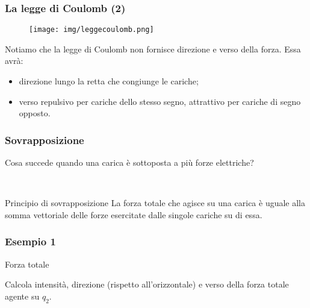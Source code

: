 \documentclass[handout]{beamer}
\theoremstyle{plain}
\begin{document}
\begin{frame}
\frametitle{La legge di Coulomb (2)}
\begin{figure}
\texttt{[image: img/leggecoulomb.png]}
\end{figure}
Notiamo che la legge di Coulomb non fornisce direzione e verso della forza.{\pause} Essa avrà:
\begin{itemize}
  \item direzione lungo la retta che congiunge le cariche;\pause
  \item verso repulsivo per cariche dello stesso segno, attrattivo per cariche di segno opposto.
\end{itemize}
\end{frame}







\begin{frame}
\frametitle{Sovrapposizione}
Cosa succede quando una carica è sottoposta a più forze elettriche?\pause

~

\begin{block}{Principio di sovrapposizione}
La forza totale che agisce su una carica è uguale alla \alert{somma vettoriale} delle forze esercitate dalle singole cariche su di essa.
\end{block}

\end{frame}




\begin{frame}
\frametitle{Esempio 1}
\begin{exampleblock}{Forza totale}
{\small Calcola intensità, direzione (rispetto all'orizzontale) e verso della forza totale agente su $ q_2 $.

\begin{figure}
\end{figure}
}
\end{exampleblock}
\end{frame}
\end{document}
